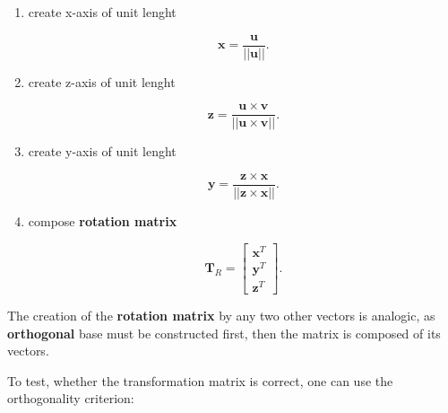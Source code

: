 \begin{enumerate}
\begin{bbox}[0.85]
            \begin{enumerate}
                \item create x-axis of unit lenght

                    \begin{equation}
                        \mathbf{x} = \frac{\mathbf{u}}{||\mathbf{u}||}
                    .\end{equation}

                \item create z-axis of unit lenght

                    \begin{equation}
                        \mathbf{z}
                        = \frac{\mathbf{u} \times \mathbf{v}}{||\mathbf{u} \times \mathbf{v}||}
                    .\end{equation}

                \item create y-axis of unit lenght

                    \begin{equation}
                        \mathbf{y}
                        = \frac{\mathbf{z} \times \mathbf{x}}{||\mathbf{z} \times \mathbf{x}||}
                    .\end{equation}

                \item compose \textbf{rotation matrix}

                    \begin{equation}
                        \mathbf{T}_{R} = \begin{bmatrix}
                            \mathbf{x}^{T} \\
                            \mathbf{y}^{T} \\
                            \mathbf{z}^{T}
                        \end{bmatrix}
                    .\end{equation}
            \end{enumerate}

            The creation of the \textbf{rotation matrix} by any two other vectors is
            analogic, as \textbf{orthogonal} base must be constructed first, then
            the matrix is composed of its vectors.
        \end{bbox}

        \begin{bbox}[0.85]

            To test, whether the transformation matrix is correct, one can use
            the orthogonality criterion:


\end{bbox}
\end{enumerate}
